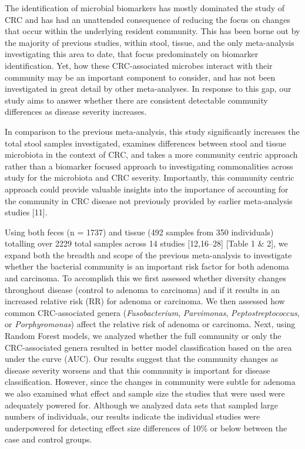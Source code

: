 \documentclass[12pt,]{article}
\begin{document}
The identification of microbial biomarkers has mostly dominated the
study of CRC and has had an unattended consequence of reducing the focus
on changes that occur within the underlying resident community. This has
been borne out by the majority of previous studies, within stool,
tissue, and the only meta-analysis investigating this area to date, that
focus predominately on biomarker identification. Yet, how these
CRC-associated microbes interact with their community may be an
important component to consider, and has not been investigated in great
detail by other meta-analyses. In response to this gap, our study aims
to answer whether there are consistent detectable community differences
as disease severity increases.

In comparison to the previous meta-analysis, this study significantly
increases the total stool samples investigated, examines differences
between stool and tissue microbiota in the context of CRC, and takes a
more community centric approach rather than a biomarker focused approach
to investigating commonalities across study for the microbiota and CRC
severity. Importantly, this community centric approach could provide
valuable insights into the importance of accounting for the community in
CRC disease not previously provided by earlier meta-analysis studies
{[}11{]}.

Using both feces (n = 1737) and tissue (492 samples from 350
individuals) totalling over 2229 total samples across 14 studies
{[}12,16--28{]} {[}Table 1 \& 2{]}, we expand both the breadth and scope
of the previous meta-analysis to investigate whether the bacterial
community is an important risk factor for both adenoma and carcinoma. To
accomplish this we first assessed whether diversity changes throughout
disease (control to adenoma to carcinoma) and if it results in an
increased relative risk (RR) for adenoma or carcinoma. We then assessed
how common CRC-associated genera (\emph{Fusobacterium},
\emph{Parvimonas}, \emph{Peptostreptococcus}, or \emph{Porphyromonas})
affect the relative risk of adenoma or carcinoma. Next, using Random
Forest models, we analyzed whether the full community or only the
CRC-associated genera resulted in better model classification based on
the area under the curve (AUC). Our results suggest that the community
changes as disease severity worsens and that this community is important
for disease classification. However, since the changes in community were
subtle for adenoma we also examined what effect and sample size the
studies that were used were adequately powered for. Although we analyzed
data sets that sampled large numbers of individuals, our results
indicate the individual studies were underpowered for detecting effect
size differences of 10\% or below between the case and control groups.
\end{document}
